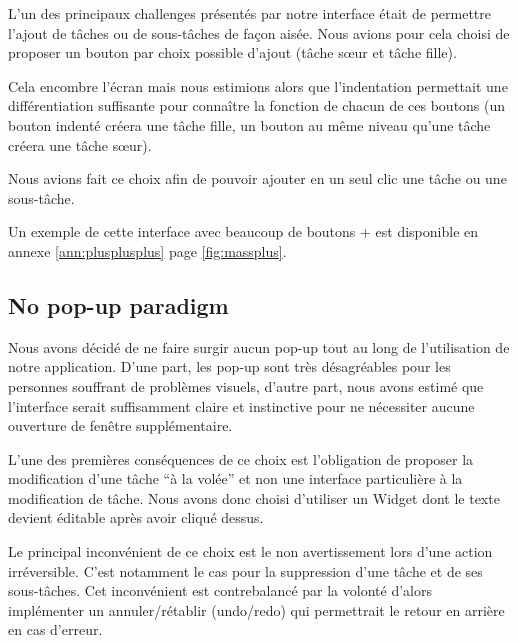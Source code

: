\documentclass[11pt]{article}
\begin{document}
L'un des principaux challenges présentés par notre interface était de
permettre l'ajout de tâches ou de sous-tâches de façon aisée. Nous
avions pour cela choisi de proposer un bouton par choix possible
d'ajout (tâche sœur et tâche fille).

Cela encombre l'écran mais nous estimions alors que l'indentation
permettait une différentiation suffisante pour connaître la fonction
de chacun de ces boutons (un bouton indenté créera une tâche fille, un
bouton au même niveau qu'une tâche créera une tâche sœur).

Nous avions fait ce choix afin de pouvoir ajouter en un seul clic une
tâche ou une sous-tâche.

Un exemple de cette interface avec beaucoup de boutons + est
disponible en annexe \ref{ann:plusplusplus} page \ref{fig:massplus}.




\subsection{No pop-up paradigm}

Nous avons décidé de ne faire surgir aucun pop-up tout au long de
l'utilisation de notre application. D'une part, les pop-up sont très
désagréables pour les personnes souffrant de problèmes visuels,
d'autre part, nous avons estimé que l'interface serait suffisamment
claire et instinctive pour ne nécessiter aucune ouverture de fenêtre
supplémentaire.

L'une des premières conséquences de ce choix est l'obligation de
proposer la modification d'une tâche ``à la volée'' et non une
interface particulière à la modification de tâche. Nous avons donc
choisi d'utiliser un Widget dont le texte devient éditable après avoir
cliqué dessus.

Le principal inconvénient de ce choix est le non avertissement lors
d'une action irréversible. C'est notamment le cas pour la suppression
d'une tâche et de ses sous-tâches. Cet inconvénient est contrebalancé
par la volonté d'alors implémenter un annuler/rétablir (undo/redo) qui
permettrait le retour en arrière en cas d'erreur.

\end{document}
